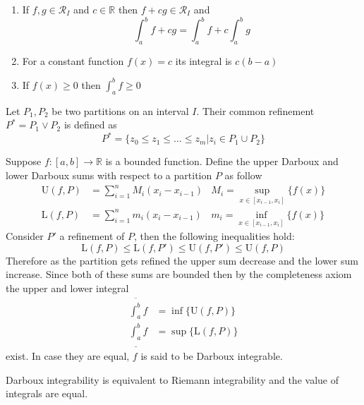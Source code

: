 \begin{corollary}  \leavevmode
    \begin{enumerate}
        \item 	If \(f,g \in \mathcal{R}_I\) and \(c \in \mathbb{R}\) then \(f + cg \in \mathcal{R}_I\) and
              \begin{equation*}
                  \int_a^b{f +cg } =  \int_a^b{f} + c\int_a^b{g}
              \end{equation*}
        \item For a constant function \(f(x) = c \) its integral is \(c(b-a)\)
        \item If \(f(x) \geq 0\) then \(\int_{a}^{b}{f} \geq 0\)
    \end{enumerate}
\end{corollary}
\begin{definition}
    Let \(P_1,P_2\) be two partitions on an interval \(I\). Their common refinement \(P^* = P_1 \lor P_2\) is defined as
    \begin{equation*}
        P^* = \{z_0 \leq z_1 \leq \dots \leq z_{m} | z_i \in P_1 \cup P_2\}
    \end{equation*}
\end{definition}
\begin{definition}
    Suppose \(f : [a,b] \to \mathbb{R}\) is a bounded function. Define the upper Darboux and lower Darboux sums with respect to a partition \(P\) as follow
    \begin{align*}
        \text{U}(f,P) & = \sum_{i = 1}^n{M_i(x_i - x_{i-1})} & M_i = \sup\limits_{x \in [x_{i-1},x_i]}{\{f(x)\}} \\
        \text{L}(f,P) & = \sum_{i = 1}^n{m_i(x_i - x_{i-1})} & m_i = \inf\limits_{x \in [x_{i-1},x_i]}{\{f(x)\}}
    \end{align*}
    Consider \(P'\) a refinement of \(P\), then the following inequalities hold:
    \begin{equation*}
        \text{L}(f,P) \leq \text{L}(f,P') \leq 	\text{U}(f,P') \leq \text{U}(f,P)
    \end{equation*}
    Therefore as the partition gets refined the upper sum decrease and the lower sum increase. Since both of these sums are bounded then by the completeness axiom the upper and lower integral
    \begin{align*}
        \overline{\int_{a}^{b}}f  & = \inf{\{\text{U}(f,P)\}} \\
        \underline{\int_{a}^{b}}f & = \sup{\{\text{L}(f,P)\}}
    \end{align*}
    exist. In case they are equal, \(f\) is said to be Darboux integrable.
\end{definition}
\begin{theorem}
    Darboux integrability is equivalent to Riemann integrability and the value of integrals are equal.
\end{theorem}

